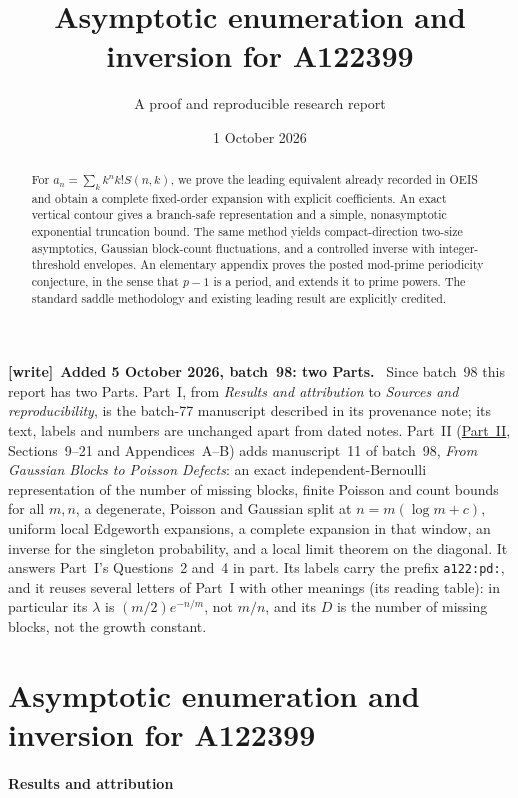 \documentclass[11pt,letterpaper]{article}
\title{Asymptotic enumeration and inversion for A122399}
\author{A proof and reproducible research report}
\date{1 October 2026}
\newenvironment{writenote}[1][]{\par\smallskip\begingroup\small
 \noindent\textbf{[write]}\if\relax\detokenize{#1}\relax\else~\textbf{#1.}\fi\ }%
 {\par\endgroup\smallskip}
\numberwithin{equation}{subsection}
\theoremstyle{definition}
\theoremstyle{remark}
\theoremstyle{plain}
\begin{document}
\maketitle
\begin{abstract}
For $a_n=\sum_k k^n k!S(n,k)$, we prove the leading equivalent already recorded in OEIS and obtain a complete fixed-order expansion with explicit coefficients. An exact vertical contour gives a branch-safe representation and a simple, nonasymptotic exponential truncation bound. The same method yields compact-direction two-size asymptotics, Gaussian block-count fluctuations, and a controlled inverse with integer-threshold envelopes. An elementary appendix proves the posted mod-prime periodicity conjecture, in the sense that $p-1$ is a period, and extends it to prime powers. The standard saddle methodology and existing leading result are explicitly credited.
\end{abstract}

\begin{writenote}[Added 5 October 2026, batch~98: two Parts]
Since batch~98 this report has two Parts. Part~I, from \emph{Results and
attribution} to \emph{Sources and reproducibility}, is the batch-77
manuscript described in its provenance note; its text, labels and
numbers are unchanged apart from dated notes. Part~II
(\hyperref[a122:pd:part]{Part~II}, Sections~9--21 and Appendices~A--B)
adds manuscript~11 of batch~98, \emph{From Gaussian Blocks to Poisson
Defects}: an exact independent-Bernoulli representation of the number of
missing blocks, finite Poisson and count bounds for all $m,n$, a
degenerate, Poisson and Gaussian split at $n=m(\log m+c)$, uniform local
Edgeworth expansions, a complete expansion in that window, an inverse for
the singleton probability, and a local limit theorem on the diagonal. It
answers Part~I's Questions~2 and~4 in part. Its labels carry the prefix
\texttt{a122:pd:}, and it reuses several letters of Part~I with other
meanings (its reading table): in particular its $\lambda$ is
$(m/2)e^{-n/m}$, not $m/n$, and its $D$ is the number of missing blocks,
not the growth constant.
\end{writenote}

\part{Asymptotic enumeration and inversion for A122399}
\makeatletter\let\@currentlabel\@empty\makeatother
\subsection{Results and attribution}\label{a122:results-and-attribution}
\end{document}

